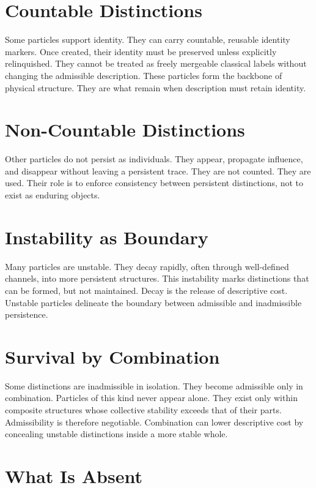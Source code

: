 \documentclass[11pt,twoside,openright]{book}
\begin{document}
\section*{Countable Distinctions}

Some particles support identity. They can carry countable, reusable identity markers. Once created, their identity must be preserved unless explicitly relinquished. They cannot be treated as freely mergeable classical labels without changing the admissible description. These particles form the backbone of physical structure. They are what remain when description must retain identity.

\section*{Non-Countable Distinctions}

Other particles do not persist as individuals. They appear, propagate influence, and disappear without leaving a persistent trace. They are not counted. They are used. Their role is to enforce consistency between persistent distinctions, not to exist as enduring objects.

\section*{Instability as Boundary}

Many particles are unstable. They decay rapidly, often through well-defined channels, into more persistent structures. This instability marks distinctions that can be formed, but not maintained. Decay is the release of descriptive cost. Unstable particles delineate the boundary between admissible and inadmissible persistence.

\section*{Survival by Combination}

Some distinctions are inadmissible in isolation. They become admissible only in combination. Particles of this kind never appear alone. They exist only within composite structures whose collective stability exceeds that of their parts. Admissibility is therefore negotiable. Combination can lower descriptive cost by concealing unstable distinctions inside a more stable whole.

\section*{What Is Absent}
\end{document}
